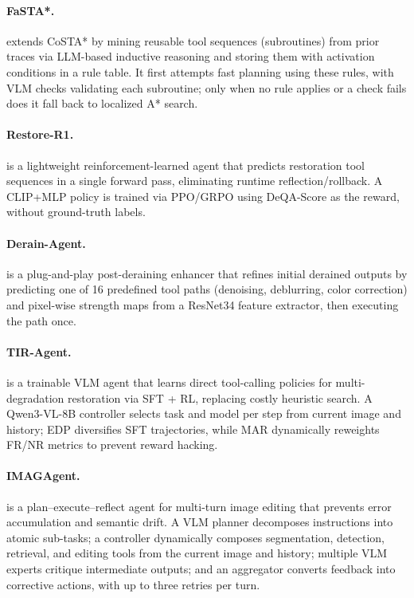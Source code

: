 \paragraph{FaSTA*.}
 extends CoSTA* by mining reusable tool sequences (subroutines) from prior traces via LLM-based inductive reasoning and storing them with activation conditions in a rule table. It first attempts fast planning using these rules, with VLM checks validating each subroutine; only when no rule applies or a check fails does it fall back to localized A* search. ~\cite{gupta2025fasta}

\paragraph{Restore-R1.}
 is a lightweight reinforcement-learned agent that predicts restoration tool sequences in a single forward pass, eliminating runtime reflection/rollback. A CLIP+MLP policy is trained via PPO/GRPO using DeQA-Score as the reward, without ground-truth labels. ~\cite{avg251218599}

\paragraph{Derain-Agent.}
 is a plug-and-play post-deraining enhancer that refines initial derained outputs by predicting one of 16 predefined tool paths (denoising, deblurring, color correction) and pixel-wise strength maps from a ResNet34 feature extractor, then executing the path once. ~\cite{avg260311866}

\paragraph{TIR-Agent.}
is a trainable VLM agent that learns direct tool-calling policies for multi-degradation restoration via SFT + RL, replacing costly heuristic search. A Qwen3-VL-8B controller selects task and model per step from current image and history; EDP diversifies SFT trajectories, while MAR dynamically reweights FR/NR metrics to prevent reward hacking. ~\cite{avg260327742}

\paragraph{IMAGAgent.}
 is a plan–execute–reflect agent for multi-turn image editing that prevents error accumulation and semantic drift. A VLM planner decomposes instructions into atomic sub-tasks; a controller dynamically composes segmentation, detection, retrieval, and editing tools from the current image and history; multiple VLM experts critique intermediate outputs; and an aggregator converts feedback into corrective actions, with up to three retries per turn. ~\cite{avg260329602}

